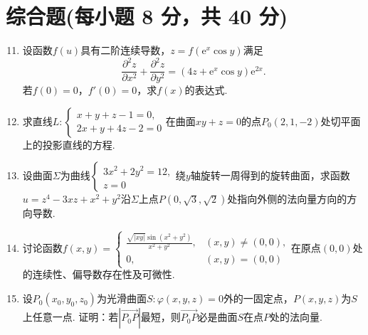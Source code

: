 \documentclass[../main.tex]{subfiles}
\begin{document}
\section{综合题(每小题 8 分，共 40 分)}
\begin{enumerate}
    \setcounter{enumi}{10}
    \item 设函数$f(u)$具有二阶连续导数，$z=f\left(\mathrm{e}^{x}\cos y\right
              )$满足
          \[
              \frac{\partial^{2} z}{\partial x^{2}}+\frac{\partial^{2} z}{\partial y^{2}}
              =\left(4z+\mathrm{e}^{x}\cos y\right)\mathrm{e}^{2x}.
          \]
          若$f(0)=0$，$f'(0)=0$，求$f(x)$的表达式.
          \vspace{10em}

    \item 求直线$L:
              \begin{cases}
                  x+y+z-1=0, \\
                  2x+y+4z-2=0
              \end{cases}$在曲面$xy+z=0$的点$P_{0}(2,1,-2)$处切平面上的投影直线的方程.
          \vspace{11em}

    \item 设曲面$\Sigma$为曲线$\begin{cases}
                  3x^{2}+2y^{2}=12, \\
                  z=0
              \end{cases}$绕$y$轴旋转一周得到的旋转曲面，求函数$u=z^{4}-3xz+x^{2}+y^{2}$沿$\Sigma$上点$P
              \left(0,\sqrt{3},\sqrt{2}\right)$处指向外侧的法向量方向的方向导数.
          \vspace{11em}

    \item 讨论函数$f(x,y)=
              \begin{cases}
                  \frac{\sqrt{|xy|}\sin(x^{2}+y^{2})}{x^{2}+y^{2}}, & (x,y)\neq (0,0), \\
                  0,                                                & (x,y)=(0,0)
              \end{cases}$在原点$(0,0)$处的连续性、偏导数存在性及可微性.
          \vspace{11em}

    \item 设$P_{0}(x_{0},y_{0},z_{0})$为光滑曲面$S:\varphi(x,y,z)=0$外的一固定点，$P
              (x,y,z)$为$S$上任意一点. 证明：若$\left|\overrightarrow{P_0P}\right|$最短，则$\overrightarrow
              {P_0P}$必是曲面$S$在点$P$处的法向量.
          \vspace{11em}
\end{enumerate}
\end{document}
